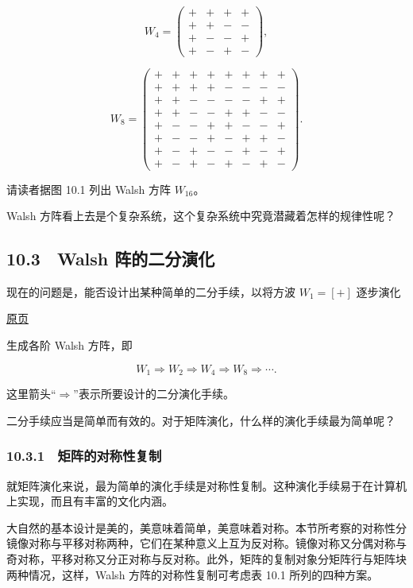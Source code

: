 \documentclass[
  10pt,
  fontset=fandol]{ctexart}
\begin{document}
\[
W_4=\begin{pmatrix}
+&+&+&+\\
+&+&-&-\\
+&-&-&+\\
+&-&+&-
\end{pmatrix},
\]

\[
W_8=\begin{pmatrix}
+&+&+&+&+&+&+&+\\
+&+&+&+&-&-&-&-\\
+&+&-&-&-&-&+&+\\
+&+&-&-&+&+&-&-\\
+&-&-&+&+&-&-&+\\
+&-&-&+&-&+&+&-\\
+&-&+&-&-&+&-&+\\
+&-&+&-&+&-&+&-
\end{pmatrix}.
\]

请读者据图 10.1 列出 Walsh 方阵 \(W_{16}\)。

Walsh 方阵看上去是个复杂系统，这个复杂系统中究竟潜藏着怎样的规律性呢？

\subsection{10.3　Walsh 阵的二分演化}\label{walsh-ux9635ux7684ux4e8cux5206ux6f14ux5316}

现在的问题是，能否设计出某种简单的二分手续，以将方波 \(W_1=[+]\) 逐步演化

\href{../../source-images/pdf-266.jpeg}{原页}

生成各阶 Walsh 方阵，即

\[
W_1\Rightarrow W_2\Rightarrow W_4\Rightarrow W_8\Rightarrow\cdots.
\]

这里箭头``\(\Rightarrow\)''表示所要设计的二分演化手续。

二分手续应当是简单而有效的。对于矩阵演化，什么样的演化手续最为简单呢？

\subsubsection{10.3.1　矩阵的对称性复制}\label{ux77e9ux9635ux7684ux5bf9ux79f0ux6027ux590dux5236}

就矩阵演化来说，最为简单的演化手续是对称性复制。这种演化手续易于在计算机上实现，而且有丰富的文化内涵。

大自然的基本设计是美的，美意味着简单，美意味着对称。本节所考察的对称性分镜像对称与平移对称两种，它们在某种意义上互为反对称。镜像对称又分偶对称与奇对称，平移对称又分正对称与反对称。此外，矩阵的复制对象分矩阵行与矩阵块两种情况，这样，Walsh 方阵的对称性复制可考虑表 10.1 所列的四种方案。
\end{document}
